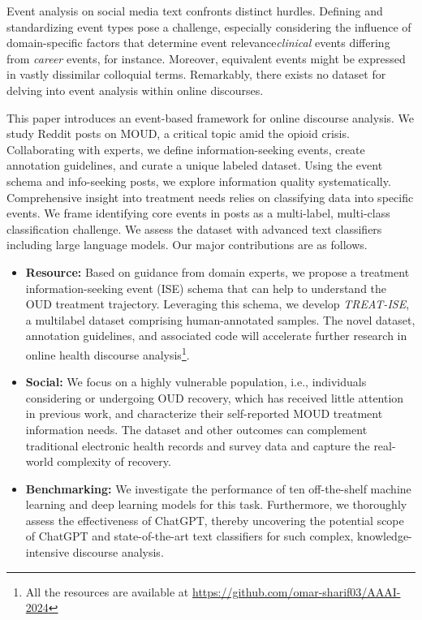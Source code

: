 \documentclass[letterpaper]{article}
\begin{document}
Event analysis on social media text confronts distinct hurdles. Defining and standardizing event types pose a challenge, especially considering the influence of domain-specific factors that determine event relevance\textit{clinical} events differing from \textit{career} events, for instance. Moreover, equivalent events might be expressed in vastly dissimilar colloquial terms. Remarkably, there exists no dataset for delving into event analysis within online discourses.


This paper introduces an event-based framework for online discourse analysis. We study Reddit posts on MOUD, a critical topic amid the opioid crisis. Collaborating with experts, we define information-seeking events, create annotation guidelines, and curate a unique labeled dataset. Using the event schema and info-seeking posts, we explore information quality systematically. Comprehensive insight into treatment needs relies on classifying data into specific events. We frame identifying core events in posts as a multi-label, multi-class classification challenge. We assess the dataset with advanced text classifiers including large language models.
Our major contributions are as follows.
\begin{itemize}

    \item \textbf{Resource:} Based on guidance from domain experts, we propose a treatment information-seeking event (ISE) schema that can help to understand the OUD treatment trajectory. Leveraging this schema, we develop \textit{TREAT-ISE}, a multilabel dataset comprising human-annotated samples. The novel dataset, annotation guidelines, and associated code will accelerate further research in online health discourse analysis\footnote{All the resources are available at \url{https://github.com/omar-sharif03/AAAI-2024}}.

     \item \textbf{Social:} We focus on a highly vulnerable population, i.e., individuals considering or undergoing OUD recovery, which has received little attention in previous work, and characterize their self-reported MOUD treatment information needs. The dataset and other outcomes can complement traditional electronic health records and survey data and capture the real-world complexity of recovery.
    \item \textbf{Benchmarking:} We investigate the performance of ten off-the-shelf machine learning and deep learning models for this task. Furthermore, we thoroughly assess the effectiveness of ChatGPT, thereby uncovering the potential scope of ChatGPT and state-of-the-art text classifiers for such complex, knowledge-intensive discourse analysis.
\end{itemize}
\end{document}
